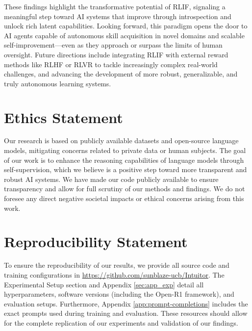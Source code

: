 \documentclass{article} %
\begin{document}
These findings highlight the transformative potential of RLIF, signaling a meaningful step toward AI systems that improve through introspection and unlock rich latent capabilities. Looking forward, this paradigm opens the door to AI agents capable of autonomous skill acquisition in novel domains and scalable self-improvement—even as they approach or surpass the limits of human oversight. Future directions include integrating RLIF with external reward methods like RLHF or RLVR to tackle increasingly complex real-world challenges, and advancing the development of more robust, generalizable, and truly autonomous learning systems.

\section*{Ethics Statement}
Our research is based on publicly available datasets and open-source language models, mitigating concerns related to private data or human subjects. The goal of our work is to enhance the reasoning capabilities of language models through self-supervision, which we believe is a positive step toward more transparent and robust AI systems. We have made our code publicly available to ensure transparency and allow for full scrutiny of our methods and findings. We do not foresee any direct negative societal impacts or ethical concerns arising from this work.

\section*{Reproducibility Statement}
To ensure the reproducibility of our results, we provide all source code and training configurations in \url{https://github.com/sunblaze-ucb/Intuitor}. The Experimental Setup section and Appendix \ref{sec:app_exp} detail all hyperparameters, software versions (including the Open-R1 framework), and evaluation setups. Furthermore, Appendix \ref{app:prompt-completions} includes the exact prompts used during training and evaluation. These resources should allow for the complete replication of our experiments and validation of our findings.




\appendix
\newpage


\end{document}
